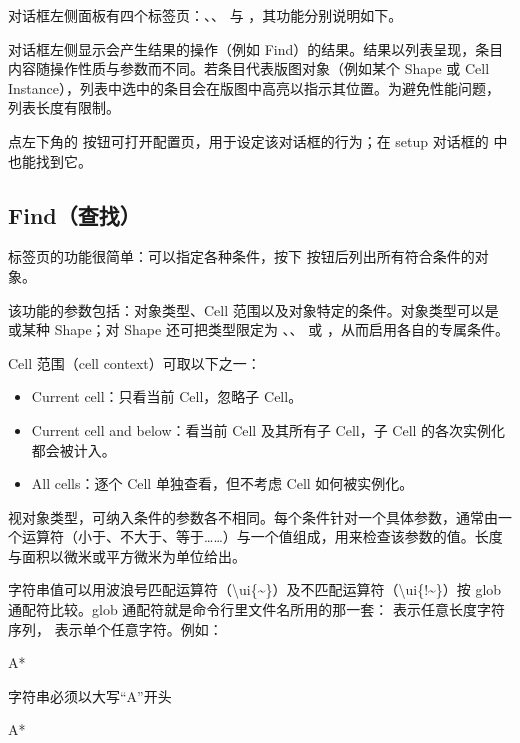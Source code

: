 对话框左侧面板有四个标签页：、、 与 ，其功能分别说明如下。

对话框左侧显示会产生结果的操作（例如 Find）的结果。结果以列表呈现，条目内容随操作性质与参数而不同。若条目代表版图对象（例如某个 Shape 或 Cell Instance），列表中选中的条目会在版图中高亮以指示其位置。为避免性能问题，列表长度有限制。

点左下角的  按钮可打开配置页，用于设定该对话框的行为；在 setup 对话框的  中也能找到它。

\subsection{Find（查找）}

 标签页的功能很简单：可以指定各种条件，按下  按钮后列出所有符合条件的对象。

该功能的参数包括：对象类型、Cell 范围以及对象特定的条件。对象类型可以是  或某种 Shape；对 Shape 还可把类型限定为 、、 或 ，从而启用各自的专属条件。

Cell 范围（cell context）可取以下之一：

\begin{itemize}
\item Current cell：只看当前 Cell，忽略子 Cell。
\item Current cell and below：看当前 Cell 及其所有子 Cell，子 Cell 的各次实例化都会被计入。
\item All cells：逐个 Cell 单独查看，但不考虑 Cell 如何被实例化。
\end{itemize}

视对象类型，可纳入条件的参数各不相同。每个条件针对一个具体参数，通常由一个运算符（小于、不大于、等于……）与一个值组成，用来检查该参数的值。长度与面积以微米或平方微米为单位给出。

字符串值可以用波浪号匹配运算符（\textbackslash{}ui\{\textasciitilde{}\}）及不匹配运算符（\textbackslash{}ui\{!\textasciitilde{}\}）按 glob 通配符比较。glob 通配符就是命令行里文件名所用的那一套：\ui{*} 表示任意长度字符序列， 表示单个任意字符。例如：

\begin{kldesc}
\item A*
\end{kldesc}

字符串必须以大写“A”开头

\begin{kldesc}
\item *A*
\end{kldesc}

